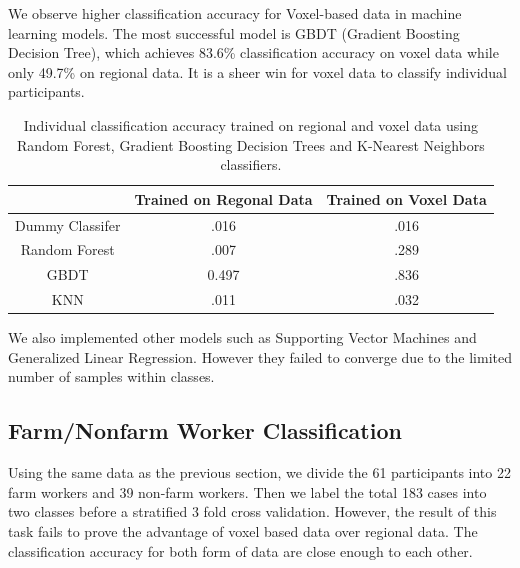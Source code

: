 \documentclass{article}[12pt]
\begin{document}
We observe higher classification accuracy for Voxel-based data in machine learning models. The most successful model is GBDT (Gradient Boosting Decision Tree), which achieves 83.6\% classification accuracy on voxel data while only 49.7\% on regional data. It is a sheer win for voxel data to classify individual participants.

\begin{table} \centering

\begin{tabular}{|c|c|c|}
\hline
        & Trained on Regonal Data & Trained on Voxel Data \\ \hline
Dummy Classifer &.016        & .016              \\ \hline
Random Forest &.007           & .289               \\ \hline
GBDT         &0.497      & .836 \\ \hline
KNN        &.011     & .032 \\ \hline      
\end{tabular}

\caption{Individual classification accuracy trained on regional and voxel data using Random Forest, Gradient Boosting Decision Trees and K-Nearest Neighbors classifiers.}
\end{table}

We also implemented other models such as Supporting Vector Machines \cite{SVM} and Generalized Linear Regression. However they failed to converge due to the limited number of	 samples within classes.



\subsection{Farm/Nonfarm Worker Classification}

Using the same data as the previous section, we divide the 61 participants into 22 farm workers and 39 non-farm workers. Then we label the total 183 cases into two classes before a stratified 3 fold cross validation. However, the result of this task fails to prove the advantage of voxel based data over regional data. The classification accuracy for both form of data are close enough to each other. 
\end{document}
